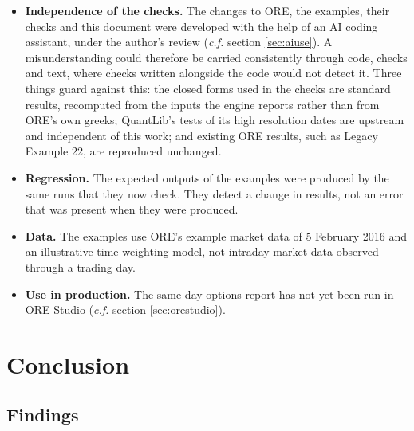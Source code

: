 \documentclass[12pt, a4paper]{article}
\begin{document}
\begin{itemize}
\item \textbf{Independence of the checks.} The changes to ORE, the examples, their checks and this document were
  developed with the help of an AI coding assistant, under the author's review (\textit{c.f.} section
  \ref{sec:aiuse}). A misunderstanding could therefore be carried consistently through code, checks and text, where
  checks written alongside the code would not detect it. Three things guard against this: the closed forms used in the
  checks are standard results, recomputed from the inputs the engine reports rather than from ORE's own greeks;
  QuantLib's tests of its high resolution dates are upstream and independent of this work; and existing ORE results,
  such as Legacy Example 22, are reproduced unchanged.
\item \textbf{Regression.} The expected outputs of the examples were produced by the same runs that they now check.
  They detect a change in results, not an error that was present when they were produced.
\item \textbf{Data.} The examples use ORE's example market data of 5 February 2016 and an illustrative time weighting model, not
  intraday market data observed through a trading day.
\item \textbf{Use in production.} The same day options report has not yet been run in ORE Studio (\textit{c.f.}
  section \ref{sec:orestudio}).
\end{itemize}

\section{Conclusion}\label{sec:conclusion}

\subsection{Findings}
\end{document}
